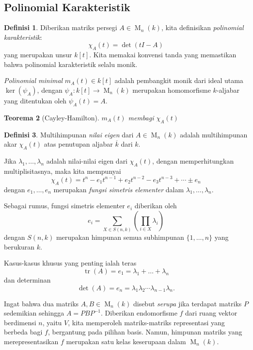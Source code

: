 \documentclass[12pt]{article}
\theoremstyle{plain}
\newtheorem{theorem}{Teorema}[section]
\theoremstyle{definition}
\newtheorem{definition}[theorem]{Definisi}
\theoremstyle{remark}
\numberwithin{equation}{section}
\begin{document}
\subsection{Polinomial Karakteristik}

\begin{definition}
Diberikan matriks persegi $A \in \operatorname{M}_n(k)$, kita definisikan
\emph{polinomial karakteristik}:
\[
\chi_A(t) = \det(tI-A)
\]
yang merupakan unsur $k[t]$.
Kita memakai konvensi tanda yang memastikan bahwa
polinomial karakteristik selalu monik.

\emph{Polinomial minimal} $m_A(t) \in k[t]$ adalah pembangkit monik
dari ideal utama $\ker(\psi_A)$, dengan
$\psi_A : k[t] \to \operatorname{M}_n(k)$ merupakan homomorfisme $k$-aljabar
yang ditentukan oleh $\psi_A(t)=A$.
\end{definition}

\begin{theorem}[Cayley-Hamilton]
$m_A(t)$ membagi $\chi_A(t)$
\end{theorem}

\begin{definition}
Multihimpunan \emph{nilai eigen} dari $A \in \operatorname{M}_n(k)$ adalah
multihimpunan akar $\chi_A(t)$ atas penutupan aljabar
$\overline{k}$ dari $k$.
\end{definition}

Jika $\lambda_1, \ldots, \lambda_n$ adalah nilai-nilai eigen dari $\chi_A(t)$,
dengan memperhitungkan multiplisitasnya,
maka kita mempunyai
\[
\chi_A(t) = t^n - e_1 t^{n-1} + e_2 t^{n-2} - e_3 t^{n-3} + \cdots \pm e_n
\]
dengan $e_1,\ldots, e_n$ merupakan \emph{fungsi simetris elementer}
dalam $\lambda_1,\ldots, \lambda_n$.

Sebagai rumus, fungsi simetris elementer $e_i$
diberikan oleh
\[
e_i = \sum_{X \in S(n,k)} \left(\prod_{i \in X} \lambda_i\right)
\]
dengan $S(n,k)$ merupakan himpunan semua subhimpunan $\{1,\ldots,n\}$ yang
berukuran $k$.

Kasus-kasus khusus yang penting ialah teras
\[
\operatorname{tr}(A) = e_1 = \lambda_1 + \ldots + \lambda_n
\]
dan determinan
\[
\det(A) = e_n = \lambda_1 \lambda_2 \cdots \lambda_{n-1} \lambda_n .
\]

Ingat bahwa dua matriks $A,B \in \operatorname{M}_n(k)$ disebut \emph{serupa}
jika terdapat matriks $P$ sedemikian sehingga $A=PBP^{-1}$.
Diberikan endomorfisme $f$ dari ruang vektor berdimensi $n$, yaitu $V$,
kita memperoleh matriks-matriks representasi yang berbeda bagi $f$, bergantung
pada pilihan basis. Namun, himpunan matriks yang merepresentasikan $f$
merupakan satu kelas keserupaan dalam $\operatorname{M}_n(k)$.
\end{document}
